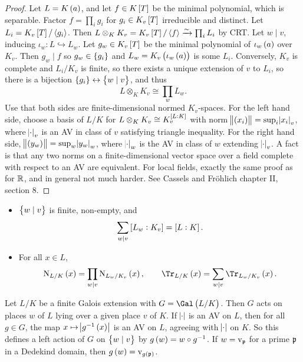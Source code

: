 \begin{proof}
Let $ L = K\br{a} $, and let $ f \in K\sbr{T} $ be the minimal polynomial, which is separable. Factor $ f = \prod_i g_i $ for $ g_i \in K_v\sbr{T} $ irreducible and distinct. Let $ L_i = K_v\sbr{T} / \abr{g_i} $. Then $ L \otimes_K K_v = K_v\sbr{T} / \abr{f} \xrightarrow{\sim} \prod_i L_i $ by CRT. Let $ w \mid v $, inducing $ \iota_w : L \hookrightarrow L_w $. Let $ g_w \in K_v\sbr{T} $ be the minimal polynomial of $ \iota_w\br{a} $ over $ K_v $. Then $ g_w \mid f $ so $ g_w \in \cbr{g_i} $ and $ L_w = K_v\br{\iota_w\br{a}} $ is some $ L_i $. Conversely, $ K_v $ is complete and $ L_i / K_v $ is finite, so there exists a unique extension of $ v $ to $ L_i $, so there is a bijection $ \cbr{g_i} \leftrightarrow \cbr{w \mid v} $, and thus
$$ L \otimes_K K_v \cong \prod_w L_w. $$
Use that both sides are finite-dimensional normed $ K_v $-spaces. For the left hand side, choose a basis of $ L / K $ for $ L \otimes_K K_v \cong K_v^{\sbr{L : K}} $ with norm $ \norm{\br{x_i}} = \sup_i \abs{x_i}_v $, where $ \abs{\cdot}_v $ is an AV in class of $ v $ satisfying triangle inequality. For the right hand side, $ \norm{\br{y_w}} = \sup_w \abs{y_w}_w $, where $ \abs{\cdot}_w $ is the AV in class of $ w $ extending $ \abs{\cdot}_v $. A fact is that any two norms on a finite-dimensional vector space over a field complete with respect to an AV are equivalent. For local fields, exactly the same proof as for $ \mathbb{R} $, and in general not much harder. See Cassels and Fr\"ohlich chapter II, section $ 8 $.
\end{proof}

\begin{corollary}
\label{cor:1.6}
\hfill
\begin{itemize}
\item $ \cbr{w \mid v} $ is finite, non-empty, and
$$ \sum_{w \mid v} \sbr{L_w : K_v} = \sbr{L : K}. $$
\item For all $ x \in L $,
$$ \N_{L / K}\br{x} = \prod_{w \mid v} \N_{L_w / K_v}\br{x}, \qquad \Tr_{L / K}\br{x} = \sum_{w \mid v} \Tr_{L_w / K_v}\br{x}. $$
\end{itemize}
\end{corollary}


Let $ L / K $ be a finite Galois extension with $ G = \Gal\br{L / K} $. Then $ G $ acts on places $ w $ of $ L $ lying over a given place $ v $ of $ K $. If $ \abs{\cdot} $ is an AV on $ L $, then for all $ g \in G $, the map $ x \mapsto \abs{g^{-1}\br{x}} $ is an AV on $ L $, agreeing with $ \abs{\cdot} $ on $ K $. So this defines a left action of $ G $ on $ \cbr{w \mid v} $ by $ g\br{w} = w \circ g^{-1} $. If $ w = \mathrm{v}_{\mathfrak{p}} $ for a prime $ \mathfrak{p} $ in a Dedekind domain, then $ g\br{w} = \v_{g\br{\ppp}} $.

